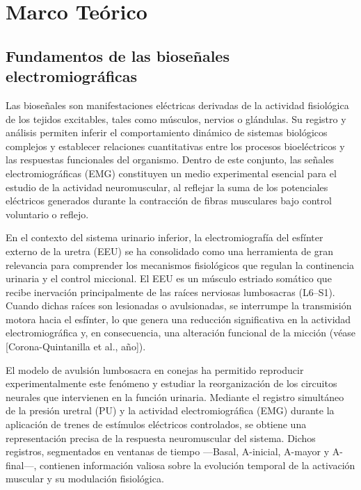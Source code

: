  \chapter{Marco Teórico}
 \label{MarcoTeorico}

\section{Fundamentos de las bioseñales electromiográficas}

\noindent Las bioseñales son manifestaciones eléctricas derivadas de la actividad fisiológica de los tejidos excitables, tales como músculos, nervios o glándulas. Su registro y análisis permiten inferir el comportamiento dinámico de sistemas biológicos complejos y establecer relaciones cuantitativas entre los procesos bioeléctricos y las respuestas funcionales del organismo. Dentro de este conjunto, las señales electromiográficas (EMG) constituyen un medio experimental esencial para el estudio de la actividad neuromuscular, al reflejar la suma de los potenciales eléctricos generados durante la contracción de fibras musculares bajo control voluntario o reflejo.

En el contexto del sistema urinario inferior, la electromiografía del esfínter externo de la uretra (EEU) se ha consolidado como una herramienta de gran relevancia para comprender los mecanismos fisiológicos que regulan la continencia urinaria y el control miccional. El EEU es un músculo estriado somático que recibe inervación principalmente de las raíces nerviosas lumbosacras (L6–S1). Cuando dichas raíces son lesionadas o avulsionadas, se interrumpe la transmisión motora hacia el esfínter, lo que genera una reducción significativa en la actividad electromiográfica y, en consecuencia, una alteración funcional de la micción (véase [Corona-Quintanilla et al., año]).

El modelo de avulsión lumbosacra en conejas ha permitido reproducir experimentalmente este fenómeno y estudiar la reorganización de los circuitos neurales que intervienen en la función urinaria. Mediante el registro simultáneo de la presión uretral (PU) y la actividad electromiográfica (EMG) durante la aplicación de trenes de estímulos eléctricos controlados, se obtiene una representación precisa de la respuesta neuromuscular del sistema. Dichos registros, segmentados en ventanas de tiempo —Basal, A-inicial, A-mayor y A-final—, contienen información valiosa sobre la evolución temporal de la activación muscular y su modulación fisiológica.

